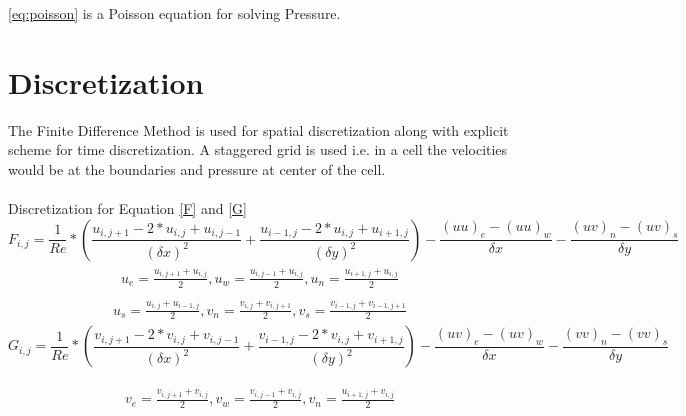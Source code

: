 \documentclass{article}
\begin{document}
\ref{eq:poisson} is a Poisson equation for solving Pressure.

\section{Discretization}

The Finite Difference Method is used for spatial discretization along with explicit scheme for time discretization. A staggered grid is used i.e. in a cell the velocities would be at the boundaries and pressure at center of the cell.\\\\
Discretization for Equation \ref{F} and \ref{G}
\begin{equation}\label{Fdisc}
F_{i,j} = \frac{1}{Re} * (\frac{u_{i,j+1} - 2*u_{i,j} + u_{i,j-1}}{(\delta x)^2} + \frac{u_{i-1,j} - 2*u_{i,j} + u_{i+1,j}}{(\delta y)^2}) - \frac{(uu)_{e} - (uu)_{w}}{\delta x} - \frac{(uv)_{n} - (uv)_{s}}{\delta y}
\end{equation}
\begin{equation*}
\begin{aligned}
\begin{gathered}
u_{e} = \frac{u_{i,j+1} + u_{i,j}}{2},
u_{w} = \frac{u_{i,j-1} + u_{i,j}}{2},
u_{n} = \frac{u_{i+1,j} + u_{i,j}}{2}
\end{gathered}
\end{aligned}
\end{equation*}
\begin{equation*}
\begin{aligned}
\begin{gathered}
u_{s} = \frac{u_{i,j} + u_{i-1,j}}{2},
v_{n} = \frac{v_{i,j} + v_{i,j+1}}{2},
v_{s} = \frac{v_{i-1,j} + v_{i-1,j+1}}{2}
\end{gathered}
\end{aligned}
\end{equation*}
\begin{equation}\label{Gdisc}
G_{i,j} = \frac{1}{Re} * (\frac{v_{i,j+1} - 2*v_{i,j} + v_{i,j-1}}{(\delta x)^2} + \frac{v_{i-1,j} - 2*v_{i,j} + v_{i+1,j}}{(\delta y)^2}) - \frac{(uv)_{e} - (uv)_{w}}{\delta x} - \frac{(vv)_{n} - (vv)_{s}}{\delta y}
\end{equation}

\begin{equation*}
\begin{aligned}
\begin{gathered}
v_{e} = \frac{v_{i,j+1} + v_{i,j}}{2},
v_{w} = \frac{v_{i,j-1} + v_{i,j}}{2},
v_{n} = \frac{u_{i+1,j} + v_{i,j}}{2}
\end{gathered}
\end{aligned}
\end{equation*}
\end{document}
